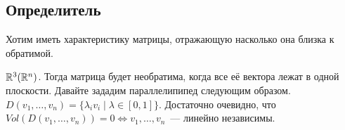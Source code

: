 \subsection{Определитель}
\begin{motivation}
    Хотим иметь характеристику матрицы, отражающую насколько она близка к обратимой.
\end{motivation}
\begin{remark}
    $\mathbb{R}^3(\mathbb{R}^n)$.
    Тогда матрица будет необратима, когда все её вектора лежат в одной плоскости.
    Давайте зададим параллелипипед следующим образом.
    $D(v_1,\dots, v_n) = \{\lambda_iv_i\mid \lambda\in [0, 1]\}$. Достаточно очевидно,
    что  $Vol(D(v_1,\dots, v_n))=0\Leftrightarrow v_1,\dots, v_n$~--- линейно независимы.
\end{remark}

